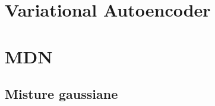 \section{Variational Autoencoder}
\section{MDN}
\subsection{Misture gaussiane} %
\label{sub:misture_gaussiane}

